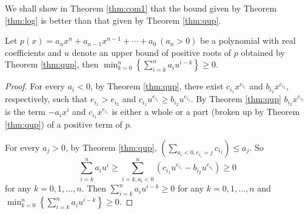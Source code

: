 

We shall show in Theorem \ref{thm:com1} that the bound given by Theorem \ref{thm:log} is better than that given by Theorem \ref{thm:qup}.

\begin{theorem}\label{thm:com}
   Let $p(x)=a_nx^n+a_{n-1}x^{n-1}+\cdots+a_0\ (a_n>0)$ be a polynomial with real coefficients and   $u$ denote an upper bound of positive roots of $p$ obtained by Theorem \ref{thm:qup}, then $\min_{k=0}^{n}\left\{  \sum_{i=k}^n a_i u^{i-k}\right\}\ge0$.

\end{theorem}

\begin{proof}

  For every $ a_i<0$, by Theorem \ref{thm:qup}, there exist  $c_{i_1}x^{e_{i_1}}$ and $b_{i_2}x^{e_{i_2}},$  respectively, such that
    $e_{i_1}>e_{i_2}$ and $c_{i_1}u^{e_{i_1}}\ge b_{i_2}u^{e_{i_2}}$. By  Theorem \ref{thm:qup} $b_{i_2}x^{e_{i_2} }$ is the term $-a_ix^i$
  and $c_{i_1}x^{e_{i_1} }$ is either a whole or a part (broken up by Theorem \ref{thm:qup}) of a positive term of $p$.

  For every  $a_j>0$, by Theorem \ref{thm:qup}, $\left( \sum_{a_i<0,e_{i_1}=j }c_{i_1} \right)\le a_{j}$. So \begin{dmath*}\sum_{i=k}^na_iu^i\ge \sum_{i=k,a_i<0}^n \left( c_{i_1}u^{e_{i_1}}-
  b_{i_2}u^{e_{i_2}} \right)\ge 0 \end{dmath*} for any $k= 0,1,\ldots,n$. Then $\sum_{i=k}^n a_i u^{i-k}\ge0 $ for any  $k= 0,1,\ldots,n$ and
  $\min_{k=0}^{n}\left\{  \sum_{i=k}^n a_i u^{i-k}\right\}\ge0$.
\end{proof}


